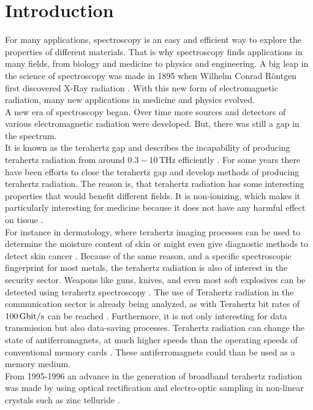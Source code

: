 \chapter{Introduction}
For many applications, spectroscopy is an easy and efficient way to explore the properties of different materials.
That is why spectroscopy finds applications in many fields, from biology and medicine to physics and engineering.
A big leap in the science of spectroscopy was made in 1895 when Wilhelm Conrad Röntgen first discovered X-Ray radiation \cite{roentgen}.
With this new form of electromagnetic radiation, many new applications in medicine and physics evolved.
\\
A new era of spectroscopy began.
Over time more sources and detectors of various electromagnetic radiation were developed.
But, there was still a gap in the spectrum.
\\
It is known as the terahertz gap and describes the incapability of producing terahertz radiation from around $0.3-10\,\si{\tera\hertz}$ efficiently \cite{THzgap_applications}.
For some years there have been efforts to close the terahertz gap and develop methods of producing terahertz radiation.
The reason is, that terahertz radiation has some interesting properties that would benefit different fields.
It is non-ionizing, which makes it particularly interesting for medicine because it does not have any harmful effect on tissue \cite{THzgap_applications}.
\\
For instance in dermatology, where terahertz imaging processes can be used to determine the moisture content of skin or might even give diagnostic methods to detect skin cancer \cite{terahertz_dermatology}. 
Because of the same reason, and a specific spectroscopic fingerprint for most metals, the terahertz radiation is also of interest in the security sector.
Weapons like guns, knives, and even most soft explosives can be detected using terahertz spectroscopy \cite{THzgap_applications} \cite{thz_explosive_detec}.
The use of Terahertz radiation in the communication sector is already being analyzed, as with Terahertz bit rates of $\SI{100}{\giga\bit\per\second}$ can be reached \cite{communication}.
Furthermore, it is not only interesting for data transmission but also data-saving processes.
Terahertz radiation can change the state of antiferromagnets, at much higher speeds than the operating speeds of conventional memory cards \cite{datasaving}.
These antiferromagnets could than be used as a memory medium.
\\
From 1995-1996 an advance in the generation of broadband terahertz radiation was made by using optical rectification and electro-optic sampling in non-linear crystals such as zinc telluride \cite{first_eos_wu_zhang}\cite{ZnTe_Nahata_Weling_1996}.
